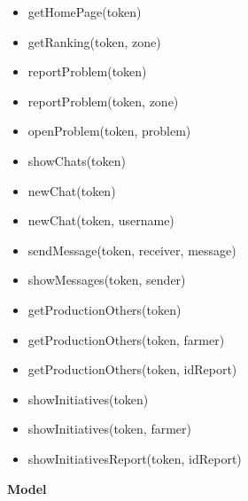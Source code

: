 \begin{itemize}
    \item getHomePage(token)
    \item getRanking(token, zone)
    \item reportProblem(token)
    \item reportProblem(token, zone)
    \item openProblem(token, problem)
    \item showChats(token)
    \item newChat(token)
    \item newChat(token, username)
    \item sendMessage(token, receiver, message)
    \item showMessages(token, sender)
    \item getProductionOthers(token)
    \item getProductionOthers(token, farmer)
    \item getProductionOthers(token, idReport)
    \item showInitiatives(token)
    \item showInitiatives(token, farmer)
    \item showInitiativesReport(token, idReport)
\end{itemize}
\textbf{Model}
